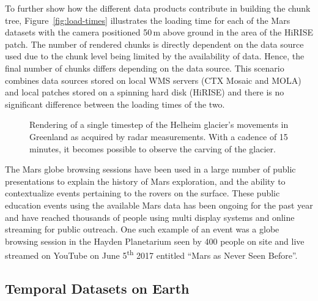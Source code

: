 \documentclass[journal]{vgtc}                %
\newcommand{\fig}[1]{Figure~\ref{fig:#1}}
\begin{document}
To further show how the different data products contribute in building the chunk tree, \fig{load-times} illustrates the loading time for each of the Mars datasets with the camera positioned 50\,m above ground in the area of the HiRISE patch.
The number of rendered chunks is directly dependent on the data source used due to the chunk level being limited by the availability of data.
Hence, the final number of chunks differs depending on the data source. 
This scenario combines data sources stored on local WMS servers (CTX Mosaic and MOLA) and local patches stored on a spinning hard disk (HiRISE) and there is no significant difference between the loading times of the two.

\begin{figure}[b!]\vspace*{-1mm}
    \centering
        \caption{Rendering of a single timestep of the Helheim glacier's movements in Greenland as acquired by radar measurements. With a cadence of 15 minutes, it becomes possible to observe the carving of the glacier.}
    \label{fig:glacier}
\end{figure}

The Mars globe browsing sessions have been used in a large number of public presentations to explain the history of Mars exploration, and the ability to contextualize events pertaining to the rovers on the surface.
These public education events using the available Mars data has been ongoing for the past year and have reached thousands of people using multi display systems and online streaming for public outreach. One such example of an event was a globe browsing session in the Hayden Planetarium seen by 400 people on site and live streamed on YouTube on June 5\textsuperscript{th} 2017 entitled ``Mars as Never Seen Before''.

\subsection{Temporal Datasets on Earth}
\end{document}

